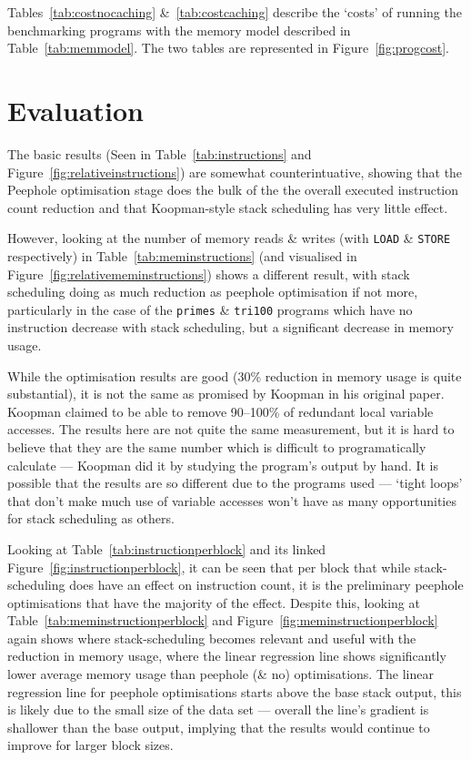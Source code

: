 Tables~\ref{tab:costnocaching} \&~\ref{tab:costcaching} describe the `costs' of
running the benchmarking programs with the memory model described in
Table~\ref{tab:memmodel}. The two tables are represented in
Figure~\ref{fig:progcost}.

\section{Evaluation}\label{sec:testingevaluation}
The basic results (Seen in Table~\ref{tab:instructions} and
Figure~\ref{fig:relativeinstructions}) are somewhat counterintuative, showing
that the Peephole optimisation stage does the bulk of the the overall executed
instruction count reduction and that Koopman-style stack scheduling has very
little effect.

However, looking at the number of memory reads \& writes (with \lstinline{LOAD}
\& \lstinline{STORE} respectively) in Table~\ref{tab:meminstructions} (and
visualised in Figure~\ref{fig:relativememinstructions}) shows a different
result, with stack scheduling doing as much reduction as peephole optimisation
if not more, particularly in the case of the \texttt{primes} \& \texttt{tri100}
programs which have no instruction decrease with stack scheduling, but a
significant decrease in memory usage.

While the optimisation results are good (30\% reduction in memory usage is
quite substantial), it is not the same as promised by Koopman in his original
paper. Koopman claimed to be able to remove 90--100\% of redundant local
variable accesses. The results here are not quite the same measurement, but it
is hard to believe that they are the same number which is difficult to
programatically calculate --- Koopman did it by studying the program's output by
hand. It is possible that the results are so different due to the programs used
--- `tight loops' that don't make much use of variable accesses won't have as
many opportunities for stack scheduling as others.

Looking at Table~\ref{tab:instructionperblock} and its linked
Figure~\ref{fig:instructionperblock}, it can be seen that per block that while
stack-scheduling does have an effect on instruction count, it is the preliminary
peephole optimisations that have the majority of the effect. Despite this,
looking at Table~\ref{tab:meminstructionperblock} and
Figure~\ref{fig:meminstructionperblock} again shows where stack-scheduling
becomes relevant and useful with the reduction in memory usage, where the linear
regression line shows significantly lower average memory usage than peephole (\&
no) optimisations. The linear regression line for peephole optimisations starts
above the base stack output, this is likely due to the small size of the data
set --- overall the line's gradient is shallower than the base output, implying
that the results would continue to improve for larger block sizes.

